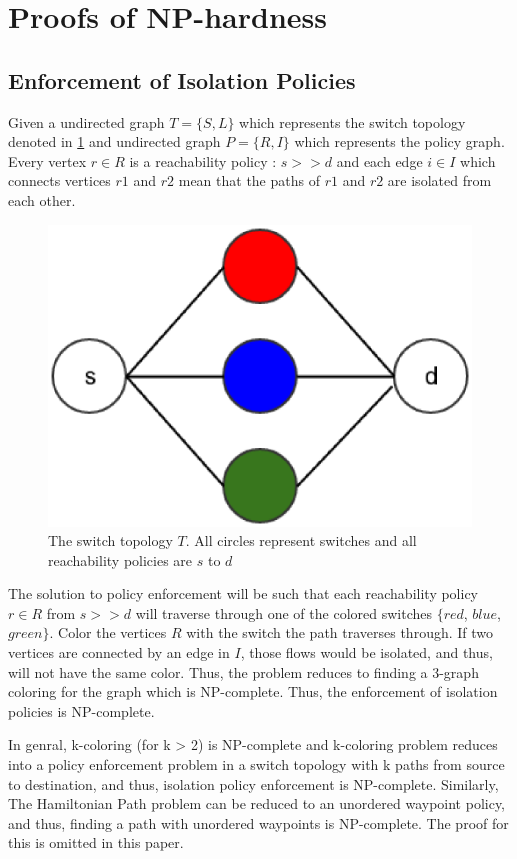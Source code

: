  \appendix
 \section{Proofs of NP-hardness} \label{sec:np}
 \subsection{Enforcement of Isolation Policies} \label{sec:isolationNP}
 Given a undirected graph $T=\{S,L\}$ which represents the switch topology denoted in \cref{fig:swtopo} and undirected graph $P =\{R,I\}$ which represents the policy graph. Every vertex $r \in R$ is a reachability policy : $s >> d$ and each edge $i \in I$ which connects vertices $r1$ and $r2$ mean that the paths of $r1$ and $r2$ are isolated from each other. 
 \begin{figure}[H] 
 	\centering
 	\includegraphics[width=0.7\columnwidth]{figures/color_topo.eps}
 	\caption{The switch topology $T$. All circles represent switches and all reachability policies are $s$ to $d$}
 	\label{fig:swtopo}
 \end{figure}
The solution to policy enforcement will be such that each reachability policy $r \in R$ from $s >> d$ will traverse through one of the colored switches $\{red$, $blue$, $green\}$. Color the vertices $R$ with the switch the path traverses through. If two vertices are connected by an edge in $I$, those flows would be isolated, and thus, will not have the same color. Thus, the problem reduces to finding a 3-graph coloring for the graph which is NP-complete. Thus, the enforcement of isolation policies is NP-complete. 
 
 In genral, k-coloring (for k > 2) is NP-complete and k-coloring problem reduces into a policy enforcement problem in a switch topology with k paths from source to destination, and thus, isolation policy enforcement is NP-complete. 
Similarly, The Hamiltonian Path problem can be reduced to an unordered waypoint policy, and thus, finding a path with unordered waypoints is NP-complete. The proof for this is omitted in this paper. 
 
